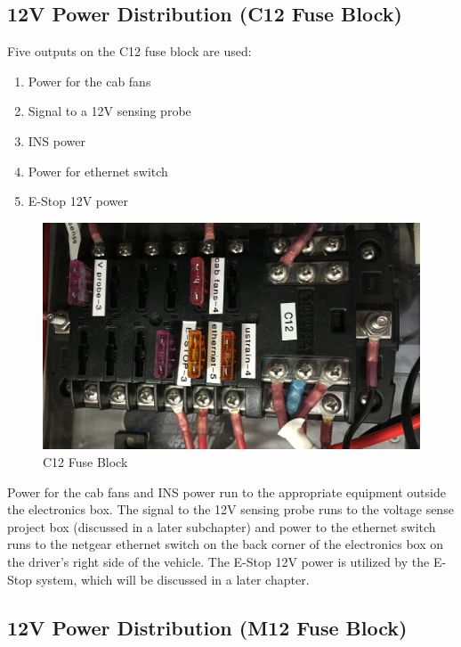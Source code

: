 \subsection{12V Power Distribution (C12 Fuse Block)}

\begin{minipage}{0.6\textwidth}
Five outputs on the C12 fuse block are used:
\begin{enumerate}
\item Power for the cab fans
\item Signal to a 12V sensing probe
\item INS power
\item Power for ethernet switch
\item E-Stop 12V power
\end{enumerate}
\end{minipage} \hfill
\begin{minipage}{0.5\textwidth}
\begin{figure}[H]
\centering
\includegraphics[scale=.06, angle=90]{Photos/C12.jpg}
\caption{\label{fig:C12} C12 Fuse Block}
\end{figure}
\end{minipage}

\bigskip

\noindent Power for the cab fans and INS power run to the appropriate equipment outside the electronics box. The signal to the 12V sensing probe runs to the voltage sense project box (discussed in a later subchapter) and power to the ethernet switch runs to the netgear ethernet switch on the back corner of the electronics box on the driver's right side of the vehicle. The E-Stop 12V power is utilized by the E-Stop system, which will be discussed in a later chapter.

\subsection{12V Power Distribution (M12 Fuse Block)}

